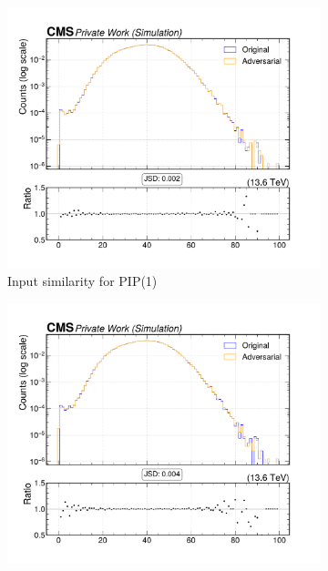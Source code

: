 \begin{figure}[htbp]
  \centering
  \begin{subfigure}[t]{0.32\textwidth}
    \includegraphics[width=\linewidth]{media/output/features/compare/intprob_1/cmp_global_features_npv.pdf}
    \caption{Input similarity for PIP(1)}
  \end{subfigure}\hfill
  \begin{subfigure}[t]{0.32\textwidth}
    \includegraphics[width=\linewidth]{media/output/features/compare/intprob_2/cmp_global_features_npv.pdf}

\end{subfigure}
\end{figure}
